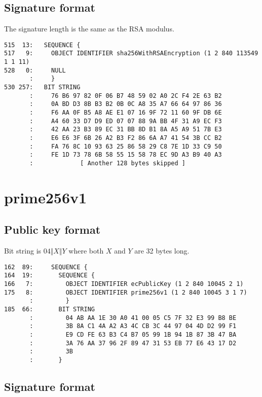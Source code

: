 \documentclass[12pt]{article}
\begin{document}
\subsection{Signature format}

\noindent
The signature length is the same as the RSA modulus.

\begin{verbatim}
515  13:   SEQUENCE {
517   9:     OBJECT IDENTIFIER sha256WithRSAEncryption (1 2 840 113549 1 1 11)
528   0:     NULL
       :     }
530 257:   BIT STRING
       :     76 B6 97 82 0F 06 B7 48 59 02 A0 2C F4 2E 63 B2
       :     0A BD D3 8B B3 B2 0B 0C A8 35 A7 66 64 97 86 36
       :     F6 AA 0F B5 A8 AE E1 07 16 9F 72 11 60 9F DB 6E
       :     A4 60 33 D7 D9 ED 07 07 88 9A BB 4F 31 A9 EC F3
       :     42 AA 23 B3 89 EC 31 BB 8D B1 8A A5 A9 51 7B E3
       :     E6 E6 3F 6B 26 A2 B3 F2 86 6A A7 41 54 3B CC B2
       :     FA 76 8C 10 93 63 25 86 58 29 C8 7E 1D 33 C9 50
       :     FE 1D 73 78 6B 58 55 15 58 78 EC 9D A3 B9 40 A3
       :             [ Another 128 bytes skipped ]
\end{verbatim}

\newpage
\section{prime256v1}

\subsection{Public key format}

\noindent
Bit string is $04\Vert X\Vert Y$ where both $X$ and $Y$ are 32 bytes long.

\begin{verbatim}
162  89:     SEQUENCE {
164  19:       SEQUENCE {
166   7:         OBJECT IDENTIFIER ecPublicKey (1 2 840 10045 2 1)
175   8:         OBJECT IDENTIFIER prime256v1 (1 2 840 10045 3 1 7)
       :         }
185  66:       BIT STRING
       :         04 AB AA 1E 30 A0 41 00 05 C5 7F 32 E3 99 B8 BE
       :         3B 8A C1 4A A2 A3 4C CB 3C 44 97 04 4D D2 99 F1
       :         E9 CD FE 63 B3 C4 B7 05 99 1B 94 1B 87 3B 47 BA
       :         3A 76 AA 37 96 2F 89 47 31 53 EB 77 E6 43 17 D2
       :         3B
       :       }
\end{verbatim}

\subsection{Signature format}
\end{document}
